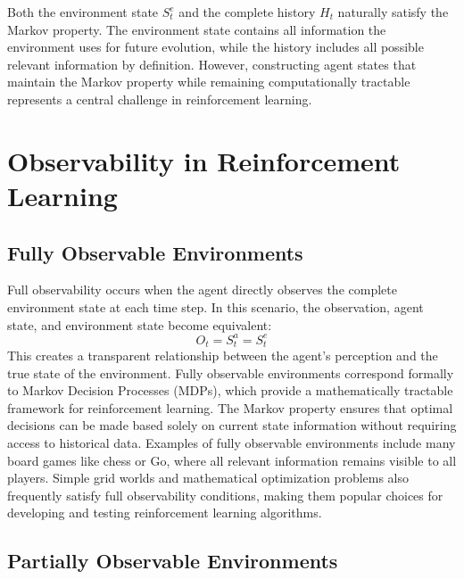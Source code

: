     Both the environment state $S_t^e$ and the complete history $H_t$ naturally satisfy the Markov property. The environment state contains all information the environment uses for future evolution, while the history includes all possible relevant information by definition. However, constructing agent states that maintain the Markov property while remaining computationally tractable represents a central challenge in reinforcement learning.


\section{Observability in Reinforcement Learning}

\subsection{Fully Observable Environments}

    Full observability occurs when the agent directly observes the complete environment state at each time step. In this scenario, the observation, agent state, and environment state become equivalent:
    \begin{equation}
    O_t = S_t^a = S_t^e
    \end{equation} This creates a transparent relationship between the agent's perception and the true state of the environment.
    Fully observable environments correspond formally to Markov Decision Processes (MDPs), which provide a mathematically tractable framework for reinforcement learning. The Markov property ensures that optimal decisions can be made based solely on current state information without requiring access to historical data.
    Examples of fully observable environments include many board games like chess or Go, where all relevant information remains visible to all players. Simple grid worlds and mathematical optimization problems also frequently satisfy full observability conditions, making them popular choices for developing and testing reinforcement learning algorithms.


\subsection{Partially Observable Environments}

